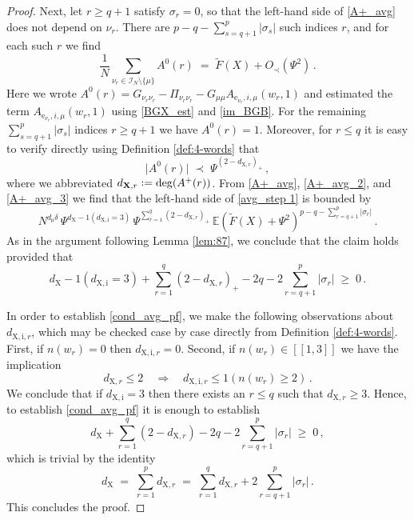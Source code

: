 \documentclass[11pt]{article} %
\numberwithin{equation}{section}
\numberwithin{figure}{section}
\theoremstyle{plain} %
\theoremstyle{definition} %
\newcommand{\f}[1]{\boldsymbol{\mathrm{#1}}} %
\renewcommand{\cal}{\mathcal}
\newcommand{\wt}{\widetilde}
\newcommand{\E}{\mathbb{E}}
\newcommand*{\deq}{\mathrel{\vcenter{\baselineskip0.65ex \lineskiplimit0pt \hbox{.}\hbox{.}}}=}
\renewcommand{\leq}{\leqslant}
\renewcommand{\geq}{\geqslant}
\newcommand{\qq}[1]{[\![{#1}]\!]}
\newcommand{\ind}[1]{\f 1 (#1)}
\newcommand{\abs}[1]{\lvert #1 \rvert}
\newcommand{\absb}[1]{\bigl\lvert #1 \bigr\rvert}
\begin{document}
\begin{proof}
Next, let $r \geq q + 1$ satisfy $\sigma_r = 0$, so that the left-hand side of \eqref{A+_avg} does not depend on $\nu_r$. There are $p - q - \sum_{s = q+1}^p \abs{\sigma_s}$ such indices $r$, and for each such $r$ we find
\begin{equation} \label{A+_avg_2}
\frac{1}{N} \sum_{\nu_r \in \cal I_N \setminus \{\mu\}} A^0(r) \;=\;  \wt F(X) + O_\prec(\Psi^2)\,.
\end{equation}
Here we wrote $A^0(r) = G_{\nu_r \nu_r} - \Pi_{\nu_r \nu_r} - G_{\mu \mu} A_{\f e_{\nu_r}, i,\mu}(w_r, 1)$ and estimated the term $A_{\f e_{\nu_r}, i,\mu}(w_r, 1)$ using \eqref{BGX_est} and \eqref{im_BGB}.
For the remaining $\sum_{s = q+1}^p \abs{\sigma_s}$ indices $r \geq q + 1$ we have $A^0(r) = 1$.
Moreover, for $r \leq q$ it is easy to verify directly using Definition \ref{def:4-words} that
\begin{equation} \label{A+_avg_3}
\absb{A^0(r)} \;\prec\; \Psi^{(2 - d_{\f X, r})_+}\,,
\end{equation}
where we abbreviated $d_{\f X, r} \deq \deg(A^+(r))$. From \eqref{A+_avg}, \eqref{A+_avg_2}, and \eqref{A+_avg_3} we find that the left-hand side of \eqref{avg_step 1} is bounded by
\begin{equation*}
N^{d_{\f \mu} \delta} \, \Psi^{d_{\f X} - \ind{d_{\f X, \f i} = 3}} \, \Psi^{\sum_{r = 1}^q (2 - d_{\f X, r})_+} \, \E (\wt F(X) + \Psi^2)^{p - q - \sum_{r = q+1}^p \abs{\sigma_r}}\,.
\end{equation*}
As in the argument following Lemma \ref{lem:87}, we conclude that the claim holds provided that
\begin{equation} \label{cond_avg_pf}
d_{\f X} - \ind{d_{\f X, \f i} = 3} + \sum_{r = 1}^q (2 - d_{\f X, r})_+ - 2q - 2 \sum_{r = q+1}^p \abs{\sigma_r} \;\geq\; 0\,.
\end{equation}

In order to establish \eqref{cond_avg_pf}, we make the following observations about $d_{\f X, \f i, r}$, which may be checked case by case directly from Definition \ref{def:4-words}. First, if $n(w_r) = 0$ then $d_{\f X, \f i, r} = 0$. Second, if $n(w_r) \in \qq{1,3}$ we have the implication
\begin{equation*}
d_{\f X, r} \leq 2 \quad \Longrightarrow \quad d_{\f X, \f i, r} \leq \ind{n(w_r) \geq 2}\,.
\end{equation*}
We conclude that if $d_{\f X, \f i} = 3$ then there exists an $r \leq q$ such that $d_{\f X, r} \geq 3$. Hence, to establish \eqref{cond_avg_pf} it is enough to establish
\begin{equation*}
d_{\f X} + \sum_{r = 1}^q (2 - d_{\f X, r}) - 2q - 2 \sum_{r = q+1}^p \abs{\sigma_r} \;\geq\; 0\,,
\end{equation*}
which is trivial by the identity
\begin{equation*}
d_{\f X} \;=\; \sum_{r = 1}^p d_{\f X,r} \;=\; \sum_{r = 1}^q d_{\f X,r} + 2 \sum_{r = q + 1}^p \abs{\sigma_r}\,.
\end{equation*}
This concludes the proof.
\end{proof}
\end{document}
